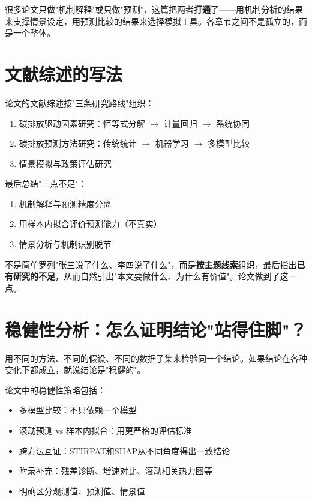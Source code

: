 \documentclass[12pt, a4paper]{article}
\begin{document}
\begin{tipbox}[这个框架好在哪？]
很多论文只做"机制解释"或只做"预测"，这篇把两者\textbf{打通}了——用机制分析的结果来支撑情景设定，用预测比较的结果来选择模拟工具。各章节之间不是孤立的，而是一个整体。
\end{tipbox}

\section{文献综述的写法}

论文的文献综述按"三条研究路线"组织：
\begin{enumerate}[leftmargin=2em]
\item 碳排放驱动因素研究：恒等式分解 $\to$ 计量回归 $\to$ 系统协同
\item 碳排放预测方法研究：传统统计 $\to$ 机器学习 $\to$ 多模型比较
\item 情景模拟与政策评估研究
\end{enumerate}

最后总结"三点不足"：
\begin{enumerate}[leftmargin=2em]
\item 机制解释与预测精度分离
\item 用样本内拟合评价预测能力（不真实）
\item 情景分析与机制识别脱节
\end{enumerate}

\begin{tipbox}[文献综述的标准写法]
不是简单罗列"张三说了什么、李四说了什么"，而是\textbf{按主题线索}组织，最后指出\textbf{已有研究的不足}，从而自然引出"本文要做什么、为什么有价值"。论文做到了这一点。
\end{tipbox}

\section{稳健性分析：怎么证明结论"站得住脚"？}

\begin{conceptbox}[稳健性分析]
用不同的方法、不同的假设、不同的数据子集来检验同一个结论。如果结论在各种变化下都成立，就说结论是"稳健的"。
\end{conceptbox}

论文中的稳健性策略包括：
\begin{itemize}[leftmargin=2em]
\item 多模型比较：不只依赖一个模型
\item 滚动预测 vs 样本内拟合：用更严格的评估标准
\item 跨方法互证：STIRPAT和SHAP从不同角度得出一致结论
\item 附录补充：残差诊断、增速对比、滚动相关热力图等
\item 明确区分观测值、预测值、情景值
\end{itemize}
\end{document}
